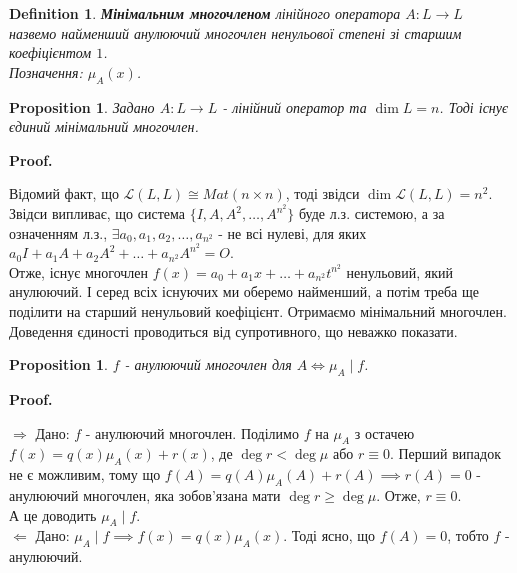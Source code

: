 \documentclass[a4paper, 10pt]{article}
\makeatletter
\def\rightproof{$\boxed{\Rightarrow}$ }
\def\leftproof{$\boxed{\Leftarrow}$ }
\theoremstyle{theoremdd}
\newtheorem{definition}[theorem]{Definition}
\newtheorem{proposition}[theorem]{Proposition}
\renewenvironment{proof}[1][Proof.\\]{\par
\pushQED{\hfill \qed}%
\normalfont \topsep6\p@\@plus6\p@\relax
\trivlist
\item\relax
{\bfseries
#1\@addpunct{.}}\hspace\labelsep\ignorespaces
}{%
\popQED\endtrivlist\@endpefalse
}
\makeatother
\begin{document}
\begin{definition}
\textbf{Мінімальним многочленом} лінійного оператора $A \colon L \to L$ назвемо найменший анулюючий многочлен ненульової степені зі старшим коефіцієнтом $1$.\\
Позначення: $\mu_A(x)$.
\end{definition}

\begin{proposition}
Задано $A \colon L \to L$ - лінійний оператор та $\dim L = n$. Тоді існує єдиний мінімальний многочлен.
\end{proposition}

\begin{proof}
Відомий факт, що $\mathcal{L}(L,L) \cong Mat(n \times n)$, тоді звідси $\dim \mathcal{L}(L,L) = n^2$. Звідси випливає, що система $\{I,A,A^2,\dots,A^{n^2}\}$ буде л.з. системою, а за означенням л.з., $\exists a_0,a_1,a_2,\dots,a_{n^2}$ - не всі нулеві, для яких $a_0I + a_1A + a_2A^2 + \dots + a_{n^2} A^{n^2} = O$.\\
Отже, існує многочлен $f(x) = a_0 + a_1x + \dots + a_{n^2}t^{n^2}$ ненульовий, який анулюючий. І серед всіх існуючих ми оберемо найменший, а потім треба ще поділити на старший ненульовий коефіцієнт. Отримаємо мінімальний многочлен.\\
Доведення єдиності проводиться від супротивного, що неважко показати.
\end{proof}

\begin{proposition}
$f$ - анулюючий многочлен для $A \iff \mu_A \mid f$.
\end{proposition}

\begin{proof}
\rightproof Дано: $f$ - анулюючий многочлен. Поділимо $f$ на $\mu_A$ з остачею\\
$f(x) = q(x)\mu_A(x) + r(x)$, де $\deg r < \deg \mu$ або $r \equiv 0$. Перший випадок не є можливим, тому що $f(A) = q(A) \mu_A(A) + r(A) \implies r(A) = 0$ - анулюючий многочлен, яка зобов'язана мати $\deg r \geq \deg \mu$. Отже, $r \equiv 0$.\\
А це доводить $\mu_A \mid f$.
\bigskip \\
\leftproof Дано: $\mu_A \mid f \implies f(x) = q(x) \mu_A(x)$. Тоді ясно, що $f(A) = 0$, тобто $f$ - анулюючий.
\end{proof}
\end{document}
